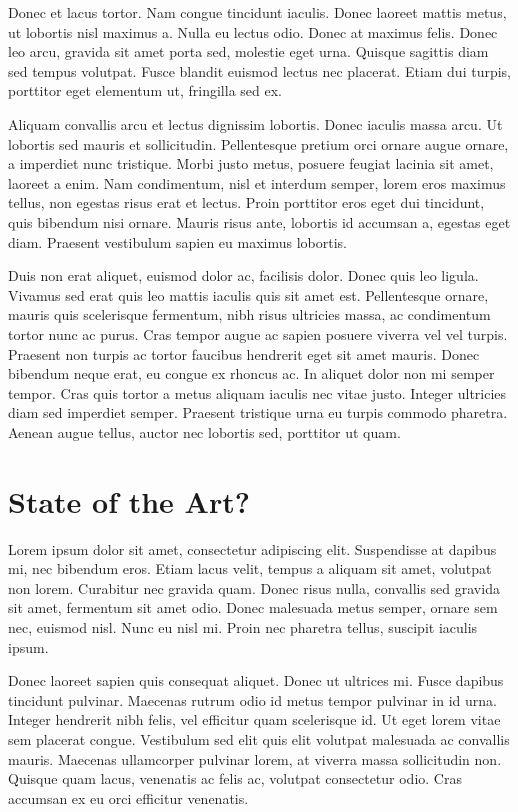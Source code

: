 Donec et lacus tortor. Nam congue tincidunt iaculis. Donec laoreet mattis metus, ut lobortis nisl maximus a. Nulla eu lectus odio. Donec at maximus felis. Donec leo arcu, gravida sit amet porta sed, molestie eget urna. Quisque sagittis diam sed tempus volutpat. Fusce blandit euismod lectus nec placerat. Etiam dui turpis, porttitor eget elementum ut, fringilla sed ex.

Aliquam convallis arcu et lectus dignissim lobortis. Donec iaculis massa arcu. Ut lobortis sed mauris et sollicitudin. Pellentesque pretium orci ornare augue ornare, a imperdiet nunc tristique. Morbi justo metus, posuere feugiat lacinia sit amet, laoreet a enim. Nam condimentum, nisl et interdum semper, lorem eros maximus tellus, non egestas risus erat et lectus. Proin porttitor eros eget dui tincidunt, quis bibendum nisi ornare. Mauris risus ante, lobortis id accumsan a, egestas eget diam. Praesent vestibulum sapien eu maximus lobortis.

Duis non erat aliquet, euismod dolor ac, facilisis dolor. Donec quis leo ligula. Vivamus sed erat quis leo mattis iaculis quis sit amet est. Pellentesque ornare, mauris quis scelerisque fermentum, nibh risus ultricies massa, ac condimentum tortor nunc ac purus. Cras tempor augue ac sapien posuere viverra vel vel turpis. Praesent non turpis ac tortor faucibus hendrerit eget sit amet mauris. Donec bibendum neque erat, eu congue ex rhoncus ac. In aliquet dolor non mi semper tempor. Cras quis tortor a metus aliquam iaculis nec vitae justo. Integer ultricies diam sed imperdiet semper. Praesent tristique urna eu turpis commodo pharetra. Aenean augue tellus, auctor nec lobortis sed, porttitor ut quam.

\section{State of the Art?}
Lorem ipsum dolor sit amet, consectetur adipiscing elit. Suspendisse at dapibus mi, nec bibendum eros. Etiam lacus velit, tempus a aliquam sit amet, volutpat non lorem. Curabitur nec gravida quam. Donec risus nulla, convallis sed gravida sit amet, fermentum sit amet odio. Donec malesuada metus semper, ornare sem nec, euismod nisl. Nunc eu nisl mi. Proin nec pharetra tellus, suscipit iaculis ipsum.

Donec laoreet sapien quis consequat aliquet. Donec ut ultrices mi. Fusce dapibus tincidunt pulvinar. Maecenas rutrum odio id metus tempor pulvinar in id urna. Integer hendrerit nibh felis, vel efficitur quam scelerisque id. Ut eget lorem vitae sem placerat congue. Vestibulum sed elit quis elit volutpat malesuada ac convallis mauris. Maecenas ullamcorper pulvinar lorem, at viverra massa sollicitudin non. Quisque quam lacus, venenatis ac felis ac, volutpat consectetur odio. Cras accumsan ex eu orci efficitur venenatis.

